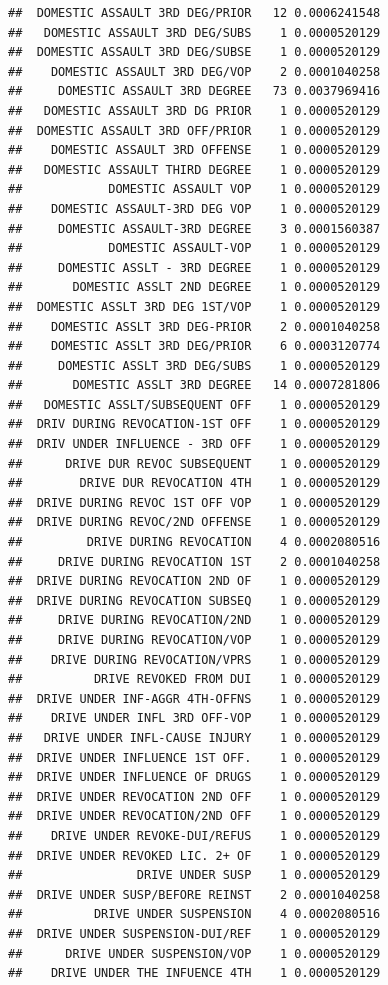 \documentclass[]{book}
\begin{document}
\begin{verbatim}
##  DOMESTIC ASSAULT 3RD DEG/PRIOR   12 0.0006241548
##   DOMESTIC ASSAULT 3RD DEG/SUBS    1 0.0000520129
##  DOMESTIC ASSAULT 3RD DEG/SUBSE    1 0.0000520129
##    DOMESTIC ASSAULT 3RD DEG/VOP    2 0.0001040258
##     DOMESTIC ASSAULT 3RD DEGREE   73 0.0037969416
##   DOMESTIC ASSAULT 3RD DG PRIOR    1 0.0000520129
##  DOMESTIC ASSAULT 3RD OFF/PRIOR    1 0.0000520129
##    DOMESTIC ASSAULT 3RD OFFENSE    1 0.0000520129
##   DOMESTIC ASSAULT THIRD DEGREE    1 0.0000520129
##            DOMESTIC ASSAULT VOP    1 0.0000520129
##    DOMESTIC ASSAULT-3RD DEG VOP    1 0.0000520129
##     DOMESTIC ASSAULT-3RD DEGREE    3 0.0001560387
##            DOMESTIC ASSAULT-VOP    1 0.0000520129
##     DOMESTIC ASSLT - 3RD DEGREE    1 0.0000520129
##       DOMESTIC ASSLT 2ND DEGREE    1 0.0000520129
##  DOMESTIC ASSLT 3RD DEG 1ST/VOP    1 0.0000520129
##    DOMESTIC ASSLT 3RD DEG-PRIOR    2 0.0001040258
##    DOMESTIC ASSLT 3RD DEG/PRIOR    6 0.0003120774
##     DOMESTIC ASSLT 3RD DEG/SUBS    1 0.0000520129
##       DOMESTIC ASSLT 3RD DEGREE   14 0.0007281806
##   DOMESTIC ASSLT/SUBSEQUENT OFF    1 0.0000520129
##  DRIV DURING REVOCATION-1ST OFF    1 0.0000520129
##  DRIV UNDER INFLUENCE - 3RD OFF    1 0.0000520129
##      DRIVE DUR REVOC SUBSEQUENT    1 0.0000520129
##        DRIVE DUR REVOCATION 4TH    1 0.0000520129
##  DRIVE DURING REVOC 1ST OFF VOP    1 0.0000520129
##  DRIVE DURING REVOC/2ND OFFENSE    1 0.0000520129
##         DRIVE DURING REVOCATION    4 0.0002080516
##     DRIVE DURING REVOCATION 1ST    2 0.0001040258
##  DRIVE DURING REVOCATION 2ND OF    1 0.0000520129
##  DRIVE DURING REVOCATION SUBSEQ    1 0.0000520129
##     DRIVE DURING REVOCATION/2ND    1 0.0000520129
##     DRIVE DURING REVOCATION/VOP    1 0.0000520129
##    DRIVE DURING REVOCATION/VPRS    1 0.0000520129
##          DRIVE REVOKED FROM DUI    1 0.0000520129
##  DRIVE UNDER INF-AGGR 4TH-OFFNS    1 0.0000520129
##    DRIVE UNDER INFL 3RD OFF-VOP    1 0.0000520129
##   DRIVE UNDER INFL-CAUSE INJURY    1 0.0000520129
##  DRIVE UNDER INFLUENCE 1ST OFF.    1 0.0000520129
##  DRIVE UNDER INFLUENCE OF DRUGS    1 0.0000520129
##  DRIVE UNDER REVOCATION 2ND OFF    1 0.0000520129
##  DRIVE UNDER REVOCATION/2ND OFF    1 0.0000520129
##    DRIVE UNDER REVOKE-DUI/REFUS    1 0.0000520129
##  DRIVE UNDER REVOKED LIC. 2+ OF    1 0.0000520129
##                DRIVE UNDER SUSP    1 0.0000520129
##  DRIVE UNDER SUSP/BEFORE REINST    2 0.0001040258
##          DRIVE UNDER SUSPENSION    4 0.0002080516
##  DRIVE UNDER SUSPENSION-DUI/REF    1 0.0000520129
##      DRIVE UNDER SUSPENSION/VOP    1 0.0000520129
##    DRIVE UNDER THE INFUENCE 4TH    1 0.0000520129

\end{verbatim}
\end{document}
